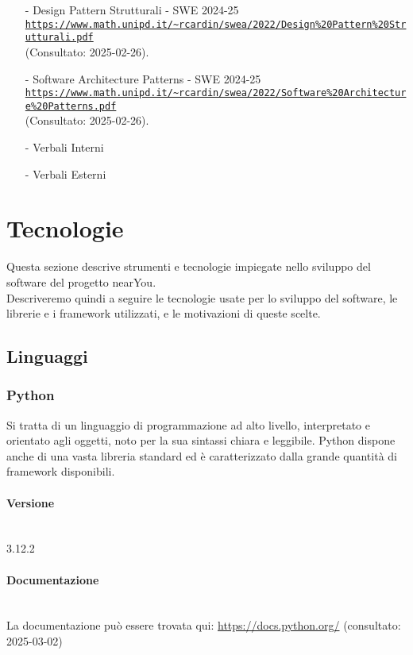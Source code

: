 \documentclass[10pt]{article}
\newcommand{\myparagraph}[1]{\paragraph{#1}\mbox{}\\\vspace{0.4em}}
\begin{document}
\begin{justify}
\begin{itemize}
    \item[-] Design Pattern Strutturali - SWE 2024-25\\
    \textcolor{blue}{\texttt{\url{https://www.math.unipd.it/~rcardin/swea/2022/Design%20Pattern%20Strutturali.pdf}}}\\ (Consultato: 2025-02-26).

    \item[-] Software Architecture Patterns - SWE 2024-25\\
    \textcolor{blue}{\texttt{\url{https://www.math.unipd.it/~rcardin/swea/2022/Software%20Architecture%20Patterns.pdf}}}\\ (Consultato: 2025-02-26).

    \item[-] Verbali Interni
    \item[-] Verbali Esterni
\end{itemize}

\section{Tecnologie}
Questa sezione descrive strumenti e tecnologie impiegate nello sviluppo del software del progetto nearYou.\\
Descriveremo quindi a seguire le tecnologie usate per lo sviluppo del software, le librerie e i framework utilizzati, e le motivazioni di queste scelte.\\

    \subsection{Linguaggi}
        \subsubsection{Python}
            Si tratta di un linguaggio di programmazione ad alto livello, interpretato e orientato agli oggetti, noto per la sua sintassi chiara e leggibile. Python dispone
            anche di una vasta libreria standard ed è caratterizzato dalla grande quantità di framework disponibili.\\
            \myparagraph{Versione}
                3.12.2
            \myparagraph{Documentazione}
                     La documentazione può essere trovata qui: \url{https://docs.python.org/} (consultato: 2025-03-02)

\end{justify}
\end{document}
